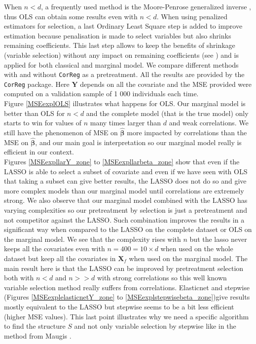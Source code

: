 \documentclass[12pt,a4paper]{report}
\begin{document}
	When $n<d$, a frequently used method is the Moore-Penrose generalized inverse \cite{katsikis2008fast}, thus OLS can obtain some results even with $n<d$. %
	When using penalized estimators for selection, a last Ordinary Least Square step is added to improve estimation because penalisation is made to select variables but also shrinks remaining coefficients. This last step allows to keep the benefits of shrinkage (variable selection) without any impact on remaining coefficients (see \cite{SAM10088}) and is applied for both classical and marginal model.
	We compare different methods with and without {\tt CorReg} as a pretreatment. All the results are provided by the {\tt CorReg} package. Here $\boldsymbol{Y}$ depends on all the covariate and the MSE provided were computed on a validation sample of 1 000 individuals each time. \\
	
	Figure \ref{MSEexplOLS}%
	illustrates what happens for OLS. 
Our marginal model is better than OLS for $n<d$ and the complete model (that is the true model) only starts to win for values of $n$ many times larger than $d$ and weak correlations. We still have the phenomenon of MSE on $\hat{\boldsymbol{\beta}}$ more impacted by correlations than the MSE on $\hat{\boldsymbol{\beta}}$, and our main goal is interpretation so our marginal model really is efficient in our context. \\

Figures \ref{MSEexpllarY_zone} to \ref{MSEexpllarbeta_zone} show that even if the LASSO is able to select a subset of covariate and even if we have seen with OLS that taking a subset can give better results, the LASSO does not do so and give more complex models than our marginal model until correlations are extremely strong. We also observe that our marginal model combined with the LASSO has varying complexities so our pretreatment by selection is just a pretreatment and not competitor against the LASSO. Such combination improves the results in a significant way when compared to the LASSO on the complete dataset or OLS on the marginal model. We see that the complexity rises with $n$ but the lasso never keeps all the covariates even with $n=400=10\times d$ when used on the whole dataset but keep all the covariates in $\boldsymbol{X}_f$ when used on the marginal model. The main result here is that the LASSO can be improved by pretreatment selection both with $n<d$ and $n>>d$ with strong correlations so this well known variable selection method really suffers from correlations. Elasticnet and stepwise (Figures \ref{MSEexplelasticnetY_zone} to \ref{MSEexplstepwisebeta_zone})give results mostly equivalent to the LASSO but stepwise seems to be a bit less efficient (higher MSE values). This last point illustrates why we need a specific algorithm to find the structure $S$ and not only variable selection by stepwise like in the method from Maugis \cite{maugis2009variable}. \\
\end{document}
